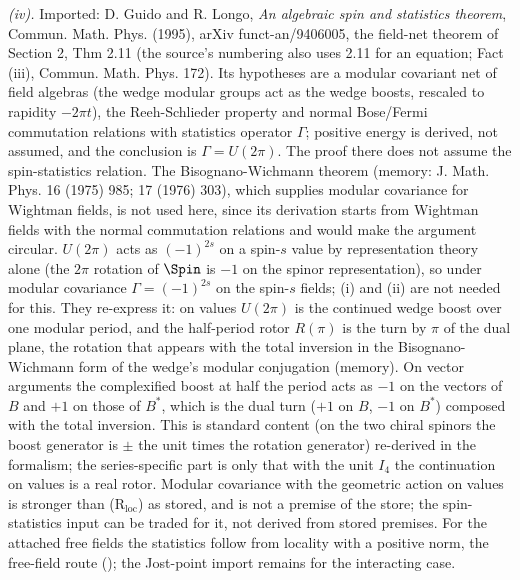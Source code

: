 \emph{(iv).} Imported: D. Guido and R. Longo, \emph{An algebraic spin and statistics theorem}, Commun. Math. Phys. (1995), arXiv funct-an/9406005, the field-net theorem of Section 2, Thm 2.11 (the source's numbering also uses 2.11 for an equation; Fact (iii), Commun. Math. Phys. 172). Its hypotheses are a modular covariant net of field algebras (the wedge modular groups act as the wedge boosts, rescaled to rapidity $-2\pi t$), the Reeh-Schlieder property and normal Bose/Fermi commutation relations with statistics operator $\Gamma$; positive energy is derived, not assumed, and the conclusion is $\Gamma = U(2\pi)$. The proof there does not assume the spin-statistics relation. The Bisognano-Wichmann theorem (memory: J. Math. Phys. 16 (1975) 985; 17 (1976) 303), which supplies modular covariance for Wightman fields, is not used here, since its derivation starts from Wightman fields with the normal commutation relations and would make the argument circular. $U(2\pi)$ acts as $(-1)^{2s}$ on a spin-$s$ value by representation theory alone (the $2\pi$ rotation of $\Spin$ is $-1$ on the spinor representation), so under modular covariance $\Gamma = (-1)^{2s}$ on the spin-$s$ fields; (i) and (ii) are not needed for this. They re-express it: on values $U(2\pi)$ is the continued wedge boost over one modular period, and the half-period rotor $R(\pi)$ is the turn by $\pi$ of the dual plane, the rotation that appears with the total inversion in the Bisognano-Wichmann form of the wedge's modular conjugation (memory). On vector arguments the complexified boost at half the period acts as $-1$ on the vectors of $B$ and $+1$ on those of $B^{*}$, which is the dual turn ($+1$ on $B$, $-1$ on $B^{*}$) composed with the total inversion. This is standard content (on the two chiral spinors the boost generator is $\pm$ the unit times the rotation generator) re-derived in the formalism; the series-specific part is only that with the unit $I_{4}$ the continuation on values is a real rotor. Modular covariance with the geometric action on values is stronger than (R$_{\mathrm{loc}}$) as stored, and is not a premise of the store; the spin-statistics input can be traded for it, not derived from stored premises. For the attached free fields the statistics follow from locality with a positive norm, the free-field route (); the Jost-point import remains for the interacting case.
